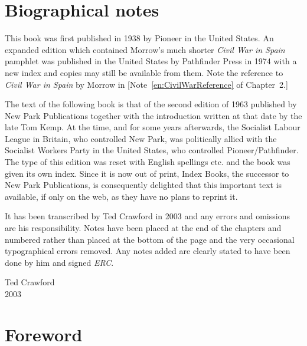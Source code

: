 \chapter{Biographical notes}

This book was first published in 1938 by Pioneer in the United States.
An expanded edition which contained Morrow’s much shorter \emph{Civil War in Spain} pamphlet was published in the United States by Path\-finder Press in 1974 with a new index and copies may still be available from them. Note the reference to \emph{Civil War in Spain} by Morrow in [Note~\ref{en:CivilWarReference} of Chapter~2.]

The text of the following book is that of the second edition of 1963 published by New Park Publications together with the introduction written at that date by the late Tom Kemp. At the time, and for some years afterwards, the Socialist Labour League in Britain, who controlled New Park, was politically allied with the Socialist Workers Party in the United States, who controlled Pioneer/Pathfinder. The type of this edition was reset with English spellings etc. and the book was given its own index. Since it is now out of print, Index Books, the successor to New Park Publications, is consequently delighted that this important text is available, if only on the web, as they have no plans to reprint it.

It has been transcribed by Ted Crawford in 2003 and any errors and omissions are his responsibility. Notes have been placed at the end of the chapters and numbered rather than placed at the bottom of the page and the very occasional typographical errors removed. Any notes added are clearly stated to have been done by him and signed \emph{ERC}.

\begin{flushright}
	Ted Crawford \\
	2003
\end{flushright}

\chapter{Foreword}

